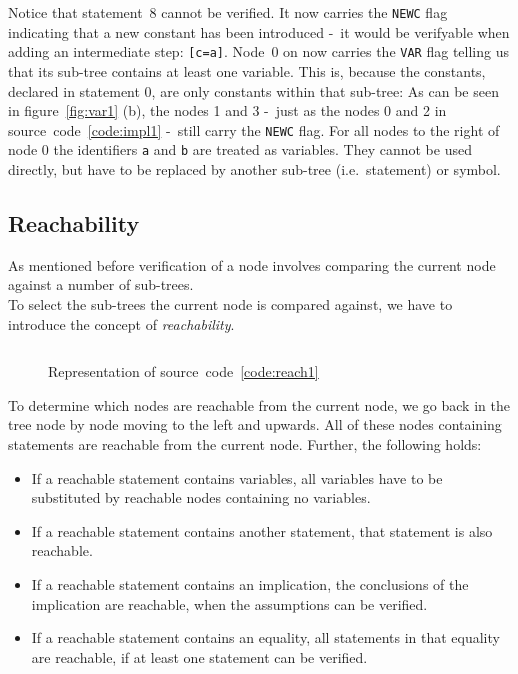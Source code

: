 \documentclass[british]{article}
\newenvironment{code}{\captionsetup{type=listing}}{}
\newcommand\prv{bc}
\newcommand\m[1]{\texttt{#1}}
\begin{document}
Notice that statement~8 cannot be verified. It now carries the \texttt{NEWC}
flag indicating that a new constant has been introduced -\ it would be
verifyable when adding an intermediate step: \m{[c=a]}. Node~0 on now carries
the \texttt{VAR} flag telling us that its sub-tree contains at least one
variable.  This is, because the constants, declared in statement 0, are only
constants within that sub-tree: As can be seen in figure~\ref{fig:var1} (b), the
nodes 1 and 3 -\ just as the nodes 0 and 2 in source~code~\ref{code:impl1} -\
still carry the \texttt{NEWC} flag.  For all nodes to the right of node 0 the
identifiers \m{a} and \m{b} are treated as variables. They cannot be used
directly, but have to be replaced by another sub-tree (i.e.\ statement) or
symbol.

\pagebreak{}

\subsection{Reachability}


As mentioned before verification of a node involves comparing the current node
against a number of sub-trees.\\ To select the sub-trees the current node is
compared against, we have to introduce the concept of \emph{reachability}.


\begin{code}
\label{code:reach1}
\inputminted[linenos]{\prv}{examples/reach1.prove}
\end{code}

\begin{figure}[!h]
\caption{Representation of source~code~\ref{code:reach1}}\label{fig:reach1}
\centering
{}
\end{figure}

To determine which nodes are reachable from the current node, we go back in the
tree node by node moving to the left and upwards. All of these nodes containing
statements are reachable from the current node. Further, the following holds:

\begin{itemize}
	\item
		If a reachable statement contains variables, all variables have to be
		substituted by reachable nodes containing no variables.
	\item
		If a reachable statement contains another statement, that statement is
		also reachable.
	\item
		If a reachable statement contains an implication, the conclusions of the
		implication are reachable, when the assumptions can be verified. 
	\item
		If a reachable statement contains an equality, all statements in that
		equality are reachable, if at least one statement can be verified.
\end{itemize}
\end{document}
